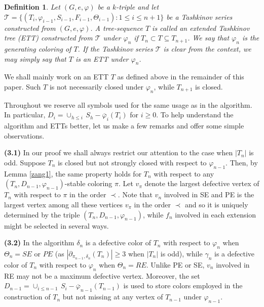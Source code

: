 \documentclass[11pt]{article}
\newtheorem{definition}[theorem]{Definition}
\newcommand{\TT}{\mathcal {T}}
\newcommand{\phibar}{\overline{\varphi}}
\newcommand{\phiv}{\varphi}
\begin{document}
\begin{definition} \label{wz1}
{\rm Let $(G,e, \varphi)$ be a $k$-triple and let $\TT=\{(T_i, \phiv_{i-1}, S_{i-1}, F_{i-1}, \Theta_{i-1}): 	1\le i \le n+1\}$  be a Tashkinov 
series constructed from $(G,e, \varphi)$.  A tree-sequence $T$ is called an {\em extended Tashkinov 
tree} (ETT)\label{ETT} constructed from $\TT$ under $\varphi_n$ if $T_n\subset T\subseteq T_{n+1}$. 
We say that $\varphi_n$ is the {\em generating coloring}\label{generatingcoloring} of $T$. If the Tashkinov series $\TT$ is clear 
from the context, we may simply say that $T$ is an ETT under $\varphi_n$.}
\end{definition}




We shall mainly work on an ETT $T$ as defined above in the remainder of this paper. Such $T$ is not necessarily closed under 
$\varphi_n$, while $T_{n+1}$ is closed.

Throughout we reserve all symbols used for the same usage as in the algorithm. In particular, $D_i=\cup_{h\leq i} \, S_h-\phibar_i(T_i)$
for $i \ge 0$. To help understand the algorithm and ETTs better, let us make a few remarks and offer some simple observations.

{\bf (3.1)}  In our proof we shall always restrict our attention to the case when $|T_n|$ is odd. Suppose $T_n$ is closed but not 
strongly closed with respect to $\phiv_{n-1}$. Then, by Lemma \ref{zang1}, the same property holds for $T_n$ with respect to 
any $(T_n, D_{n-1}, \phiv_{n-1})$-stable coloring $\pi$. Let $v_{\pi}$ denote the largest defective vertex of $T_n$ with respect to $\pi$ 
in the order $\prec$. Note that $v_n$ involved in SE and PE is the largest vertex among all these vertices $v_{\pi}$ in the order $\prec$ 
and so it is uniquely determined by the triple $(T_n, D_{n-1}, \phiv_{n-1})$, while $f_n$ involved in each extension might be selected in several ways.  

{\bf (3.2)}  In the algorithm $\delta_n$ is a defective color of $T_n$ with respect to $\varphi_n$ when $\Theta_n =SE$ 
or $PE$ (as $|\partial_{ \pi_{n-1}, \delta_n}(T_n)|\ge 3$ when $|T_n|$ is odd), while $\gamma_n$ is a defective color 
of $T_n$ with respect to $\varphi_n$ when $\Theta_n =RE$.  Unlike PE or SE, $v_n$ involved in RE may not be a maximum defective 
vertex. Moreover, the set $D_{n-1}=\cup_{i \le n-1} \, S_i - \phibar_{n-1}(T_{n-1})$ is used to store colors employed in the construction of 
$T_n$ but not missing at any vertex of $T_{n-1}$ under $\varphi_{n-1}$.
\end{document}
